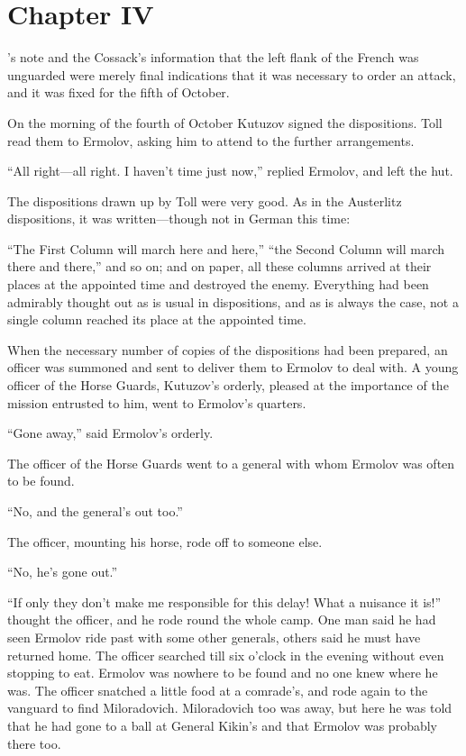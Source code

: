 \chapter*{Chapter IV} \ifaudio {}
\fi

's note and the Cossack's information that the left
flank of the French was unguarded were merely final indications
that it was necessary to order an attack, and it was fixed for
the fifth of October.

On the morning of the fourth of October Kutuzov signed the
dispositions.  Toll read them to Ermolov, asking him to attend to
the further arrangements.

``All right---all right. I haven't time just now,'' replied
Ermolov, and left the hut.

The dispositions drawn up by Toll were very good. As in the
Austerlitz dispositions, it was written---though not in German
this time:

``The First Column will march here and here,'' ``the Second
Column will march there and there,'' and so on; and on paper, all
these columns arrived at their places at the appointed time and
destroyed the enemy.  Everything had been admirably thought out
as is usual in dispositions, and as is always the case, not a
single column reached its place at the appointed time.

When the necessary number of copies of the dispositions had been
prepared, an officer was summoned and sent to deliver them to
Ermolov to deal with. A young officer of the Horse Guards,
Kutuzov's orderly, pleased at the importance of the mission
entrusted to him, went to Ermolov's quarters.

``Gone away,'' said Ermolov's orderly.

The officer of the Horse Guards went to a general with whom
Ermolov was often to be found.

``No, and the general's out too.''

The officer, mounting his horse, rode off to someone else.

``No, he's gone out.''

``If only they don't make me responsible for this delay! What a
nuisance it is!'' thought the officer, and he rode round the
whole camp. One man said he had seen Ermolov ride past with some
other generals, others said he must have returned home. The
officer searched till six o'clock in the evening without even
stopping to eat. Ermolov was nowhere to be found and no one knew
where he was. The officer snatched a little food at a comrade's,
and rode again to the vanguard to find Miloradovich.
Miloradovich too was away, but here he was told that he had gone
to a ball at General Kikin's and that Ermolov was probably there
too.

